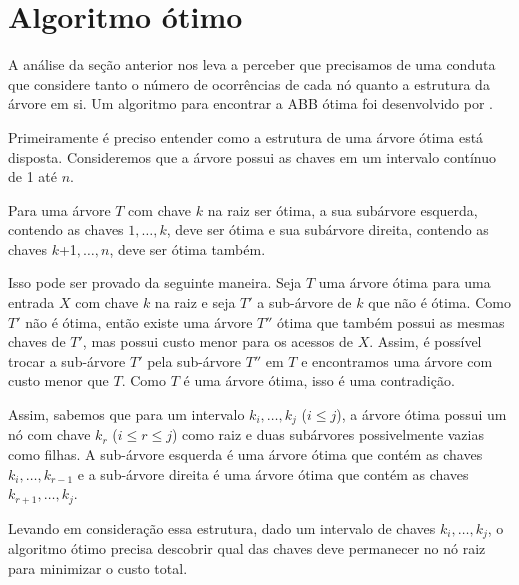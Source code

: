 \section{Algoritmo ótimo}

A análise da seção anterior nos leva a perceber que precisamos de uma conduta que considere tanto o número de ocorrências de cada nó quanto a estrutura da árvore em si. Um algoritmo para encontrar a ABB ótima foi desenvolvido por \cite{knuth}.

Primeiramente é preciso entender como a estrutura de uma árvore ótima está disposta. Consideremos que a árvore possui as chaves em um intervalo contínuo de 1 até $n$. 

Para uma árvore $T$ com chave $k$ na raiz ser ótima, a sua subárvore esquerda, contendo as chaves $1,\dots,k$, deve ser ótima e sua subárvore direita, contendo as chaves $k$+1$,\dots,n$, deve ser ótima também.

Isso pode ser provado da seguinte maneira. Seja $T$ uma árvore ótima para uma entrada $X$ com chave $k$ na raiz e seja $T'$ a sub-árvore de $k$ que não é ótima. Como $T'$ não é ótima, então existe uma árvore $T''$ ótima que também possui as mesmas chaves de $T'$, mas possui custo menor para os acessos de $X$. Assim, é possível trocar a sub-árvore $T'$ pela sub-árvore $T''$ em $T$ e encontramos uma árvore com custo menor que $T$. Como $T$ é uma árvore ótima, isso é uma contradição.

Assim, sabemos que para um intervalo $k_i, \ldots, k_j$ ($i \leq j$), a árvore ótima possui um nó com chave $k_r$ ($i \leq r \leq j$) como raiz e duas subárvores possivelmente vazias como filhas. A sub-árvore esquerda é uma árvore ótima que contém as chaves $k_i, \ldots, k_{r-1}$ e a sub-árvore direita é uma árvore ótima que contém as chaves $k_{r+1}, \ldots, k_j$.

Levando em consideração essa estrutura, dado um intervalo de chaves $k_i, \ldots, k_j$, o algoritmo ótimo precisa descobrir qual das chaves deve permanecer no nó raiz para minimizar o custo total.